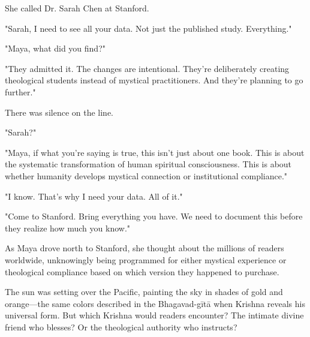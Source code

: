 \documentclass[11pt,twoside]{book}
\begin{document}
She called Dr. Sarah Chen at Stanford.

"Sarah, I need to see all your data. Not just the published study. Everything."

"Maya, what did you find?"

"They admitted it. The changes are intentional. They're deliberately creating theological students instead of mystical practitioners. And they're planning to go further."

There was silence on the line.

"Sarah?"

"Maya, if what you're saying is true, this isn't just about one book. This is about the systematic transformation of human spiritual consciousness. This is about whether humanity develops mystical connection or institutional compliance."

"I know. That's why I need your data. All of it."

"Come to Stanford. Bring everything you have. We need to document this before they realize how much you know."

As Maya drove north to Stanford, she thought about the millions of readers worldwide, unknowingly being programmed for either mystical experience or theological compliance based on which version they happened to purchase.

The sun was setting over the Pacific, painting the sky in shades of gold and orange—the same colors described in the Bhagavad-gītā when Krishna reveals his universal form. But which Krishna would readers encounter? The intimate divine friend who blesses? Or the theological authority who instructs?
\end{document}
